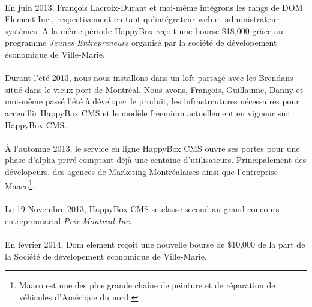 \documentclass[11pt, a4paper ]{article}
\begin{document}
\begin{spacing}{1.5}

\paragraph{}
En juin 2013, François Lacroix-Durant et moi-même intégrons les rangs de DOM Element Inc., respectivement en tant qu'intégrateur web et administrateur systèmes. A la même période HappyBox reçoit une bourse \$18,000 grâce au programme \emph{Jeunes Entrepreneurs} organisé par la société de dévelopement économique de Ville-Marie.

\paragraph{} %
Durant l'été 2013, nous nous installons dans un loft partagé avec les Brendans situé dans le vieux port de Montréal. Nous avons, François, Guillaume, Danny et moi-même passé l'été à déveloper le produit, les infrastrcutures nécessaires pour acceuillir HappyBox CMS et le modèle freemium actuellement en vigueur sur HappyBox CMS.


\paragraph{}
À l'automne 2013, le service en ligne HappyBox CMS ouvre ses portes pour une phase d'alpha privé comptant déjà une centaine d'utilisateurs. Principalement des dévelopeurs, des agences de Marketing Montréalaises ainsi que l'entreprise Maaco\footnote{Maaco est une des plus grande chaîne de peinture et de réparation de véhicules d'Amérique du nord.}.

\paragraph{}
Le 19 Novembre 2013, HappyBox CMS se classe second au grand concours entrepreunarial \emph{Prix Montreal Inc}..

\paragraph{}
En fevrier 2014, Dom element reçoit une nouvelle bourse de \$10,000 de la part de la Société de dévelopement économique de Ville-Marie.


\end{spacing}
\end{document}
